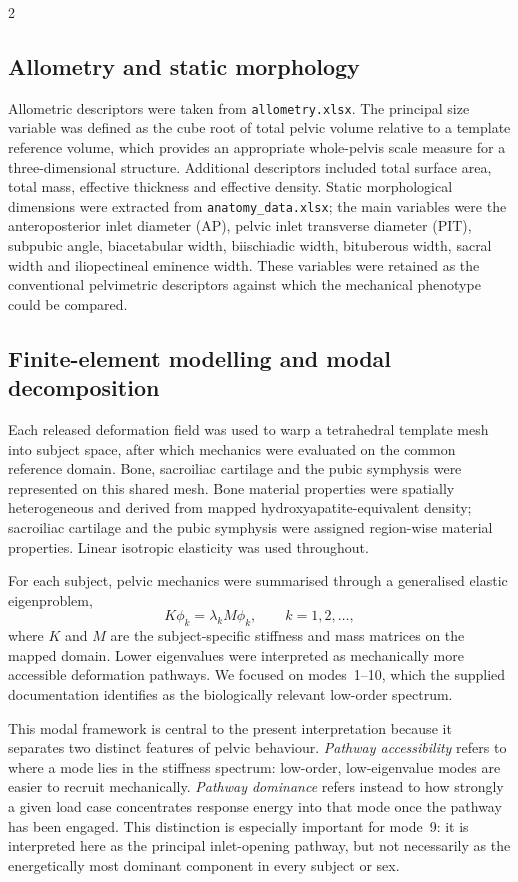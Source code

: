 \documentclass[openacc]{rsproca_new}
\begin{document}
\begin{multicols}{2}
\subsection{Allometry and static morphology}

Allometric descriptors were taken from \texttt{allometry.xlsx}. The principal size variable was defined as the cube root of total pelvic volume relative to a template reference volume, which provides an appropriate whole-pelvis scale measure for a three-dimensional structure. Additional descriptors included total surface area, total mass, effective thickness and effective density. Static morphological dimensions were extracted from \texttt{anatomy\_data.xlsx}; the main variables were the anteroposterior inlet diameter (AP), pelvic inlet transverse diameter (PIT), subpubic angle, biacetabular width, biischiadic width, bituberous width, sacral width and iliopectineal eminence width. These variables were retained as the conventional pelvimetric descriptors against which the mechanical phenotype could be compared.

\subsection{Finite-element modelling and modal decomposition}

Each released deformation field was used to warp a tetrahedral template mesh into subject space, after which mechanics were evaluated on the common reference domain. Bone, sacroiliac cartilage and the pubic symphysis were represented on this shared mesh. Bone material properties were spatially heterogeneous and derived from mapped hydroxyapatite-equivalent density; sacroiliac cartilage and the pubic symphysis were assigned region-wise material properties. Linear isotropic elasticity was used throughout.

For each subject, pelvic mechanics were summarised through a generalised elastic eigenproblem,
\begin{equation}
K\phi_{k} = \lambda_{k} M\phi_{k}, \qquad k=1,2,\ldots,
\end{equation}
where $K$ and $M$ are the subject-specific stiffness and mass matrices on the mapped domain. Lower eigenvalues were interpreted as mechanically more accessible deformation pathways. We focused on modes~1--10, which the supplied documentation identifies as the biologically relevant low-order spectrum.

This modal framework is central to the present interpretation because it separates two distinct features of pelvic behaviour. \emph{Pathway accessibility} refers to where a mode lies in the stiffness spectrum: low-order, low-eigenvalue modes are easier to recruit mechanically. \emph{Pathway dominance} refers instead to how strongly a given load case concentrates response energy into that mode once the pathway has been engaged. This distinction is especially important for mode~9: it is interpreted here as the principal inlet-opening pathway, but not necessarily as the energetically most dominant component in every subject or sex.


\end{multicols}
\end{document}
